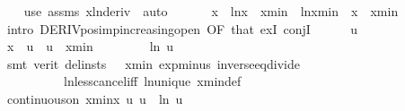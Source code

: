 \begin{isabellebody}
\ \ \isamarkupfalse%
\ {\isacharparenleft}{\kern0pt}use\ assms\ xln{\isacharunderscore}{\kern0pt}deriv\ \ auto{\isacharparenright}{\kern0pt}\isanewline
\ \ \isamarkupfalse%
\isanewline
\ \ \isamarkupfalse%
\ {\isachardoublequoteopen}x\ {\isacharasterisk}{\kern0pt}\ ln{\isacharparenleft}{\kern0pt}x{\isacharparenright}{\kern0pt}\ {\isachargreater}{\kern0pt}\ xmin\ {\isacharasterisk}{\kern0pt}\ ln{\isacharparenleft}{\kern0pt}xmin{\isacharparenright}{\kern0pt}{\isachardoublequoteclose}\ \ {\isachardoublequoteopen}x\ {\isachargreater}{\kern0pt}\ xmin{\isachardoublequoteclose}\isanewline
\ \ \isamarkupfalse%
\ {\isacharparenleft}{\kern0pt}intro\ DERIV{\isacharunderscore}{\kern0pt}pos{\isacharunderscore}{\kern0pt}imp{\isacharunderscore}{\kern0pt}increasing{\isacharunderscore}{\kern0pt}open\ {\isacharbrackleft}{\kern0pt}OF\ that{\isacharbrackright}{\kern0pt}\ exI\ conjI{\isacharparenright}{\kern0pt}\isanewline
\ \ \ \ \isamarkupfalse%
\ u\isanewline
\ \ \ \ \isamarkupfalse%
\ {\isachardoublequoteopen}x\ {\isachargreater}{\kern0pt}\ u{\isachardoublequoteclose}\ \ {\isachardoublequoteopen}u\ {\isachargreater}{\kern0pt}\ xmin{\isachardoublequoteclose}\ \isanewline
\ \ \ \ \isamarkupfalse%
\ \isamarkupfalse%
\ {\isachardoublequoteopen}ln\ u\ {\isacharplus}{\kern0pt}\ {}\ {\isachargreater}{\kern0pt}\ {}{\isachardoublequoteclose}\isanewline
\ \ \ \ \ \ \isamarkupfalse%
\ {\isacharparenleft}{\kern0pt}smt\ {\isacharparenleft}{\kern0pt}verit{\isacharcomma}{\kern0pt}\ del{\isacharunderscore}{\kern0pt}insts{\isacharparenright}{\kern0pt}\ {\isacartoucheopen}{}\ {\isacharless}{\kern0pt}\ xmin{\isacartoucheclose}\ exp{\isacharunderscore}{\kern0pt}minus\ inverse{\isacharunderscore}{\kern0pt}eq{\isacharunderscore}{\kern0pt}divide\ \isanewline
\ \ \ \ \ \ \ \ \ \ ln{\isacharunderscore}{\kern0pt}less{\isacharunderscore}{\kern0pt}cancel{\isacharunderscore}{\kern0pt}iff\ ln{\isacharunderscore}{\kern0pt}unique\ xmin{\isacharunderscore}{\kern0pt}def{\isacharparenright}{\kern0pt}\isanewline
\ \ \isamarkupfalse%
\isanewline
\ \ \ \ \isamarkupfalse%
\ {\isachardoublequoteopen}continuous{\isacharunderscore}{\kern0pt}on\ {\isacharbraceleft}{\kern0pt}xmin{\isachardot}{\kern0pt}{\isachardot}{\kern0pt}x{\isacharbraceright}{\kern0pt}\ {\isacharparenleft}{\kern0pt}{\isasymlambda}u{\isachardot}{\kern0pt}\ u\ {\isacharasterisk}{\kern0pt}\ ln\ u{\isacharparenright}{\kern0pt}{\isachardoublequoteclose}\isanewline

\end{isabellebody}
